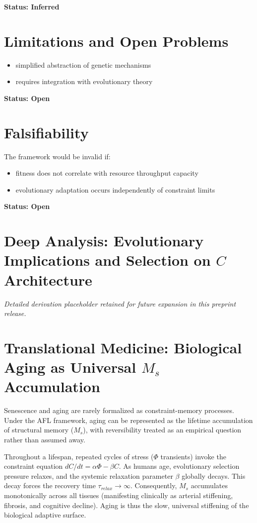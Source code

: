 \documentclass[11pt]{article}
\begin{document}
\textbf{Status: Inferred}

\section{Limitations and Open Problems}

\begin{itemize}
    \item simplified abstraction of genetic mechanisms
    \item requires integration with evolutionary theory
\end{itemize}

\textbf{Status: Open}

\section{Falsifiability}

The framework would be invalid if:

\begin{itemize}
    \item fitness does not correlate with resource throughput capacity
    \item evolutionary adaptation occurs independently of constraint limits
\end{itemize}

\textbf{Status: Open}


\section{Deep Analysis: Evolutionary Implications and Selection on $C$ Architecture}
\noindent\textit{Detailed derivation placeholder retained for future expansion in this preprint release.}



\section{Translational Medicine: Biological Aging as Universal $M_s$ Accumulation}
Senescence and aging are rarely formalized as constraint-memory processes. Under the AFL framework, aging can be represented as the lifetime accumulation of structural memory ($M_s$), with reversibility treated as an empirical question rather than assumed away. 

Throughout a lifespan, repeated cycles of stress ($\Phi$ transients) invoke the constraint equation $dC/dt = \alpha \Phi - \beta C$. As humans age, evolutionary selection pressure relaxes, and the systemic relaxation parameter $\beta$ globally decays. This decay forces the recovery time $\tau_{relax} \to \infty$. Consequently, $M_s$ accumulates monotonically across all tissues (manifesting clinically as arterial stiffening, fibrosis, and cognitive decline). Aging is thus the slow, universal stiffening of the biological adaptive surface.
\end{document}
